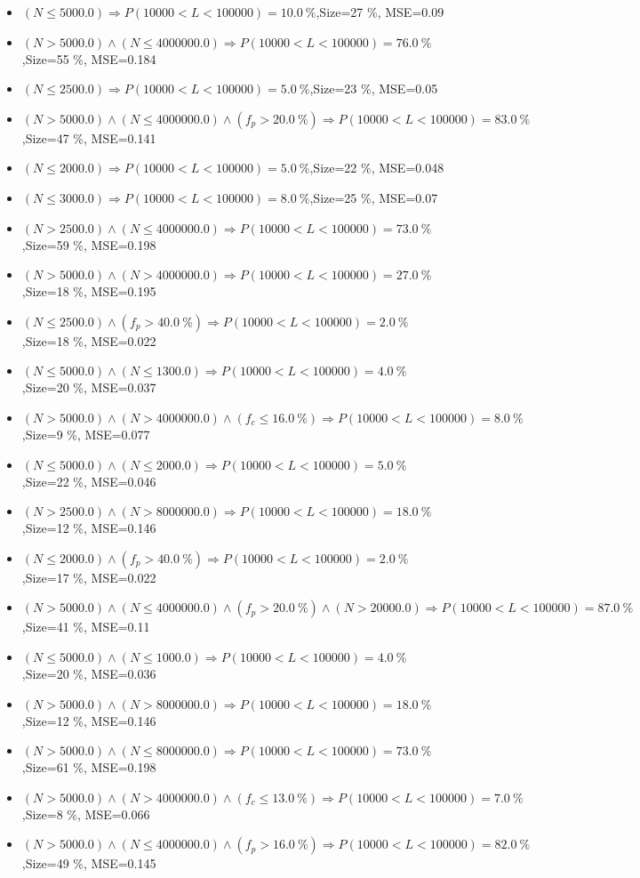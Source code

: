 \documentclass[numbered]{CSL}
\begin{document}
\begin{itemize}
\item $(N \leq 5000.0) \Rightarrow P(10 000 < L < 100 000) = 10.0~\%$,\hfill Size=27 \%, MSE=0.09
\item $(N > 5000.0) \land (N \leq 4000000.0) \Rightarrow P(10 000 < L < 100 000) = 76.0~\%$,\hfill Size=55 \%, MSE=0.184
\item $(N \leq 2500.0) \Rightarrow P(10 000 < L < 100 000) = 5.0~\%$,\hfill Size=23 \%, MSE=0.05
\item $(N > 5000.0) \land (N \leq 4000000.0) \land (f_p > 20.0~\%) \Rightarrow P(10 000 < L < 100 000) = 83.0~\%$,\hfill Size=47 \%, MSE=0.141
\item $(N \leq 2000.0) \Rightarrow P(10 000 < L < 100 000) = 5.0~\%$,\hfill Size=22 \%, MSE=0.048
\item $(N \leq 3000.0) \Rightarrow P(10 000 < L < 100 000) = 8.0~\%$,\hfill Size=25 \%, MSE=0.07
\item $(N > 2500.0) \land (N \leq 4000000.0) \Rightarrow P(10 000 < L < 100 000) = 73.0~\%$,\hfill Size=59 \%, MSE=0.198
\item $(N > 5000.0) \land (N > 4000000.0) \Rightarrow P(10 000 < L < 100 000) = 27.0~\%$,\hfill Size=18 \%, MSE=0.195
\item $(N \leq 2500.0) \land (f_p > 40.0~\%) \Rightarrow P(10 000 < L < 100 000) = 2.0~\%$,\hfill Size=18 \%, MSE=0.022
\item $(N \leq 5000.0) \land (N \leq 1300.0) \Rightarrow P(10 000 < L < 100 000) = 4.0~\%$,\hfill Size=20 \%, MSE=0.037
\item $(N > 5000.0) \land (N > 4000000.0) \land (f_c \leq 16.0~\%) \Rightarrow P(10 000 < L < 100 000) = 8.0~\%$,\hfill Size=9 \%, MSE=0.077
\item $(N \leq 5000.0) \land (N \leq 2000.0) \Rightarrow P(10 000 < L < 100 000) = 5.0~\%$,\hfill Size=22 \%, MSE=0.046
\item $(N > 2500.0) \land (N > 8000000.0) \Rightarrow P(10 000 < L < 100 000) = 18.0~\%$,\hfill Size=12 \%, MSE=0.146
\item $(N \leq 2000.0) \land (f_p > 40.0~\%) \Rightarrow P(10 000 < L < 100 000) = 2.0~\%$,\hfill Size=17 \%, MSE=0.022
\item $(N > 5000.0) \land (N \leq 4000000.0) \land (f_p > 20.0~\%) \land (N > 20000.0) \Rightarrow P(10 000 < L < 100 000) = 87.0~\%$,\hfill Size=41 \%, MSE=0.11
\item $(N \leq 5000.0) \land (N \leq 1000.0) \Rightarrow P(10 000 < L < 100 000) = 4.0~\%$,\hfill Size=20 \%, MSE=0.036
\item $(N > 5000.0) \land (N > 8000000.0) \Rightarrow P(10 000 < L < 100 000) = 18.0~\%$,\hfill Size=12 \%, MSE=0.146
\item $(N > 5000.0) \land (N \leq 8000000.0) \Rightarrow P(10 000 < L < 100 000) = 73.0~\%$,\hfill Size=61 \%, MSE=0.198
\item $(N > 5000.0) \land (N > 4000000.0) \land (f_c \leq 13.0~\%) \Rightarrow P(10 000 < L < 100 000) = 7.0~\%$,\hfill Size=8 \%, MSE=0.066
\item $(N > 5000.0) \land (N \leq 4000000.0) \land (f_p > 16.0~\%) \Rightarrow P(10 000 < L < 100 000) = 82.0~\%$,\hfill Size=49 \%, MSE=0.145
\end{itemize}
\end{document}
